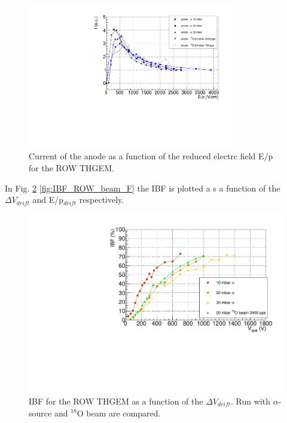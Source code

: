 \documentclass[a4paper, 11 pt]{report}
\newcommand{\Vdrift}{$ \Delta V_{drift}$}
\newcommand{\Edrift}{E/p$_{drift}$}
\begin{document}
  \begin{figure}[htbp]
	\centering
	\includegraphics[width=0.8\textwidth]{Immagini/driftScan_ROW_THGEM_comp_F.pdf}
	\caption{Current of the anode as a function of the reduced electrc field E/p for the 
	ROW THGEM.}
	\label{fig:driftScan_withbeam_F}
  \end{figure}
  In Fig. \ref{fig:IBF_ROW_beam} \ref{fig:IBF_ROW_beam_F} the IBF is plotted a s a function of the
  \Vdrift{} and \Edrift{} respectively.  
  \begin{figure}[htbp]
	\centering
	\includegraphics[width=\textwidth]{Immagini/IBF_ROW_Comparison.pdf}
	\caption{IBF for the ROW THGEM as a function of the \Vdrift. Run with 
	$\alpha$-source	and $^{18}$O beam are compared.}
	\label{fig:IBF_ROW_beam}
  \end{figure}
\end{document}
